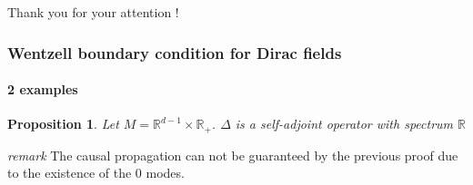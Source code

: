 \documentclass[french]{beamer}
\newtheorem{proposition}{Proposition}
\begin{document}
\begin{frame}

\centerline{\Huge{Thank you for your attention !}}

\end{frame}
\begin{frame}
\frametitle{Wentzell boundary condition for Dirac fields}
\framesubtitle{2 examples}

\begin{proposition}
Let $M = \mathbb{R}^{d-1} \times \mathbb{R}_+$. $\Delta$ is a self-adjoint operator with spectrum $\mathbb{R}$
\end{proposition}

\textit{remark}
The causal propagation can not be guaranteed by the previous proof due to the existence of the 0 modes.


\end{frame}
\end{document}
